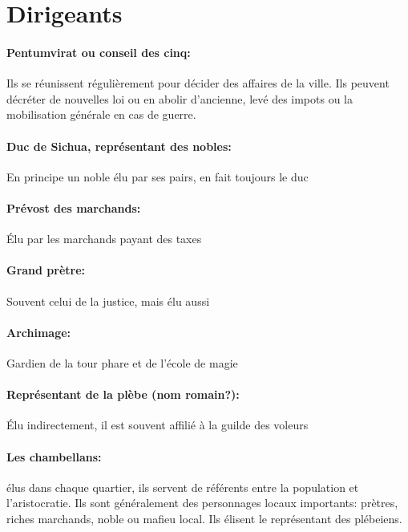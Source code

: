\section{Dirigeants}

   \paragraph{Pentumvirat ou conseil des cinq: }
       Ils se réunissent régulièrement pour décider des affaires de la 
       ville. Ils peuvent décréter de nouvelles loi ou en abolir d'ancienne,
       levé des impots ou la mobilisation générale en cas de guerre. \\

   \paragraph{Duc de Sichua, représentant des nobles: }
       En principe un noble élu par ses pairs, en fait toujours le duc \\
   \paragraph{Prévost des marchands: }
       Élu par les marchands payant des taxes \\
   \paragraph{Grand prètre: } 
       Souvent celui de la justice, mais élu aussi \\
   \paragraph{Archimage: }
       Gardien de la tour phare et de l'école de magie \\
   \paragraph{Représentant de la plèbe (nom romain?): }
       Élu indirectement, il est souvent affilié à la guilde des voleurs \\

   \paragraph{Les chambellans:} élus dans chaque quartier, ils servent de référents
       entre la population et l'aristocratie. Ils sont généralement des
       personnages locaux importants: prètres, riches marchands, noble
       ou mafieu local. Ils élisent le représentant des plébeiens. \\

